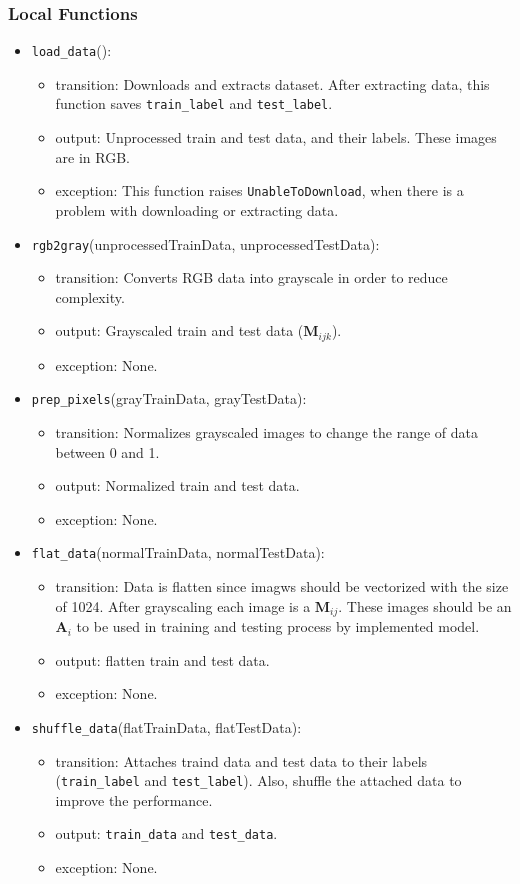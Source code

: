 \documentclass[12pt, titlepage]{article}
\def\code#1{\texttt{#1}}
\begin{document}
\subsubsection{Local Functions}
\begin{itemize}
  \item \code{load\_data}():
  \begin{itemize}
    \item transition: Downloads and extracts dataset. After extracting data, 
    this function saves \code{train\_label} and \code{test\_label}.
    \item output: Unprocessed train and test data, and their labels. 
    These images are in RGB. 
    \item exception: This function raises \code{UnableToDownload}, when there is 
    a problem with downloading or extracting data.
  \end{itemize}
  \item \code{rgb2gray}(unprocessedTrainData, unprocessedTestData):
  \begin{itemize}
    \item transition: Converts RGB data into grayscale in order to reduce complexity. 
    \item output: Grayscaled train and test data ($\mathbf{M}_{ijk}$).
    \item exception: None.
  \end{itemize}
  \item \code{prep\_pixels}(grayTrainData, grayTestData):
  \begin{itemize}
    \item transition: Normalizes grayscaled images to change the range of data between 0 and 1.
    \item output: Normalized train and test data.
    \item exception: None.
  \end{itemize}
  \item \code{flat\_data}(normalTrainData, normalTestData):
  \begin{itemize}
    \item transition: Data is flatten since imagws should be vectorized with the size of 1024. 
    After grayscaling each image is a $\mathbf{M}_{ij}$. These images should be an $\mathbf{A}_{i}$ to be used in 
    training and testing process by implemented model.
    \item output: flatten train and test data.
    \item exception: None.
  \end{itemize}
  \item \code{shuffle\_data}(flatTrainData, flatTestData):
  \begin{itemize}
    \item transition: Attaches traind data and test data to their labels 
    (\code{train\_label} and \code{test\_label}). Also, shuffle the attached data to improve the 
    performance.
    \item output: \code{train\_data} and \code{test\_data}.
    \item exception: None.
  \end{itemize}

\end{itemize}
\end{document}
